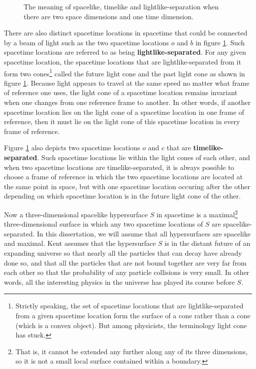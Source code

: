 \documentclass[12pt]{report}
\begin{document}
\begin{figure}[!h]
 \caption[Meaning of spacelike, timelike and lightlike-separation]{The meaning of spacelike, timelike and lightlike-separation when there are two space dimensions and one time dimension.}
 \label{cone}
\end{figure}
There are also distinct spacetime locations in spacetime that could be connected by a beam of light such as the two spacetime locations $o$ and $b$ in figure \ref{cone}. Such spacetime locations are referred to as being \textbf{lightlike-separated}. For any given spacetime location, the spacetime locations that are lightlike-separated from it form two cones\footnote{Strictly speaking, the set of spacetime locations that are lightlike-separated from a given spacetime location form the surface of a cone rather than a cone (which is a convex object). But among physicists, the terminology light cone has stuck.} called the future light cone and the past light cone as shown in figure \ref{cone}. Because light appears to travel at the same speed no matter what frame of reference one uses, the light cone of a spacetime location remains invariant when one changes from one reference frame to another. In other words, if another spacetime location lies on the light cone of a spacetime location in one frame of reference, then it must lie on the light cone of this spacetime location in every frame of reference. 

Figure \ref{cone} also depicts two spacetime locations $o$ and $c$ that are \textbf{timelike-separated}. Such spacetime locations lie within the light cones of each other, and when two spacetime locations are timelike-separated, it is always possible to choose a frame of reference in which the two spacetime locations are located at the same point in space, but with one spacetime location occuring after the other  depending on which spacetime location is in  the future light cone of the other. 

Now a three-dimensional spacelike hypersurface $S$ in spacetime is a maximal\footnote{That is, it cannot be extended any further along any of its three dimensions, so it is not a small local surface contained within a boundary.} three-dimensional surface in which any two spacetime locations of $S$ are spacelike-separated. In this dissertation, we will assume that all hypersurfaces are spacelike and maximal.
Kent assumes that the hypersurface $S$ is in the distant future of an expanding universe so that nearly all the particles that can decay have already done so, and that all the particles that are not bound together are very far from each other so that the probability of any particle collisions is very small. In other words, all the interesting physics in the universe has played its course before $S$.
\end{document}
